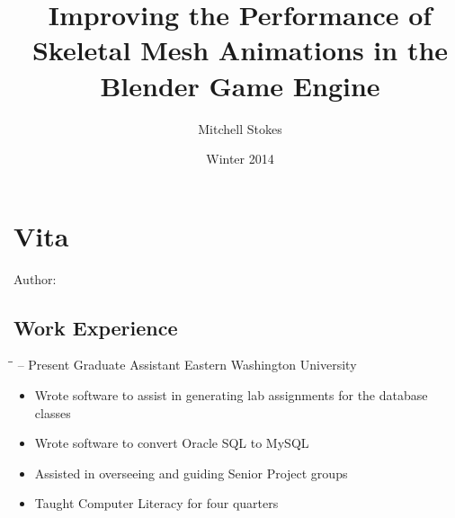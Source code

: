 \documentclass[]{ewucsthesis}
\title{Improving the Performance of Skeletal Mesh Animations in the Blender Game Engine}
\author{Mitchell Stokes}
\date{Winter 2014}
\newenvironment{experience}[4]
{
  \begin{tabbing}
  \hspace{1.4in}\= \hspace{2.2in}\= \kill %
		#1 \> #2 \> #3  \\
  \end{tabbing}\vspace{-15pt}      %
  \begin{itemize}
}
{
  \end{itemize}
}
\begin{document}
\maketitle








%
%  

\clearpage




\clearpage

\section*{Vita}

\makeatletter
Author: \@author
\makeatother


\subsection*{Work Experience}
   \vspace{-0.1in}

   \begin{experience}{2012 -- Present}{Graduate Assistant}{Eastern Washington University}{Cheney, WA}
    \item Wrote software to assist in generating lab assignments for the database classes
    \item Wrote software to convert Oracle SQL to MySQL
    \item Assisted in overseeing and guiding Senior Project groups
    \item Taught Computer Literacy for four quarters
   \end{experience}
\end{document}
